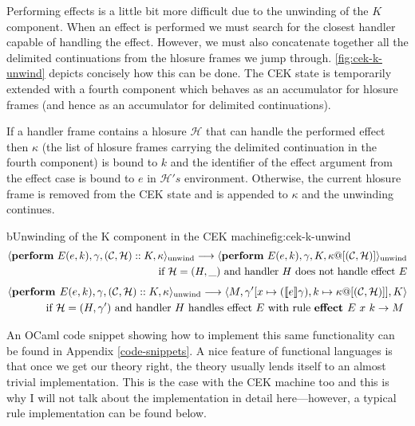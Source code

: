 \documentclass[class=article, crop=false]{standalone}
\begin{document}
Performing effects is a little bit more difficult due to the unwinding of the
$K$ component. When an effect is performed we must search for the closest
handler capable of handling the effect. However, we must also concatenate
together all the delimited continuations from the hlosure frames we jump
through. \autoref{fig:cek-k-unwind} depicts concisely how this can be done. The
CEK state is temporarily extended with a fourth component which behaves as an
accumulator for hlosure frames (and hence as an accumulator for delimited
continuations).

If a handler frame contains a hlosure $\mathcal{H}$ that can handle the
performed effect then $\kappa$ (the list of hlosure frames carrying the
delimited continuation in the fourth component) is bound to $k$ and the
identifier of the effect argument from the effect case is bound to $e$ in
$\mathcal{H}'s$ environment. Otherwise, the current hlosure frame is
removed from the CEK state and is appended to $\kappa$ and the unwinding
continues.

\begin{myfigure}[.95]{b}{Unwinding of the K component in the CEK machine}{fig:cek-k-unwind}
    \begin{align*}
        \cek{ \effPerform E(e,k), \gamma, (\konts, \hlosure) :: K, \kappa}_\text{unwind} \longrightarrow
        \cek{ \effPerform E(e,k), \gamma, K, \kappa@[(\konts, \hlosure)] }_\text{unwind} \\
        \text{ if $\hlosure = (H, \_)$ and handler $H$ does not handle effect $E$}
        \end{align*}
        \begin{align*}
        \langle  \textbf{perform } E(e,k), \gamma, (\mathcal{C}, \mathcal{H}) :: K, \kappa \rangle_\text{unwind} \longrightarrow
        \langle  M, \gamma' [x \mapsto (\llbracket e \rrbracket\gamma), k \mapsto \kappa @ [(\mathcal{C}, \mathcal{H})]], K \rangle \\
        \text{ if $\mathcal{H} = (H, \gamma')$ and handler $H$ handles effect $E$ with rule $\textbf{effect } E\ x \ k \to M$ }
        \end{align*}
\end{myfigure}

An OCaml code snippet showing how to implement this same functionality can be
found in Appendix \ref{code-snippets}. A nice feature of functional
languages is that once we get our theory right, the theory usually lends
itself to an almost trivial implementation. This is the case with the CEK
machine too and this is why I will not talk about the implementation in
detail here---however, a typical rule implementation can be found below.
\end{document}
